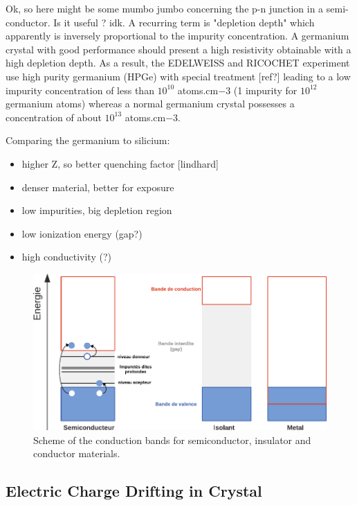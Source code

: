 Ok, so here might be some mumbo jumbo concerning the p-n junction in a semi-conductor. Is it useful ? idk.
A recurring term is "depletion depth" which apparently is inversely proportional to the impurity concentration.
A germanium crystal with good performance should present a high resistivity obtainable with a high depletion depth.
As a result, the EDELWEISS and RICOCHET experiment use high purity germanium (HPGe) with special treatment [ref?] leading to a low impurity concentration of less than $10^{10}$ atoms.cm${-3}$ (1 impurity for $10^{12}$ germanium atoms) whereas a normal germanium crystal possesses a concentration of about $10^{13}$ atoms.cm${-3}$.

Comparing the germanium to silicium:
\begin{itemize}
	\item higher Z, so better quenching factor [lindhard]
	\item denser material, better for exposure
	\item low impurities, big depletion region
	\item low ionization energy (gap?)
	\item high conductivity (?)
\end{itemize}

\begin{figure}
\centering
\includegraphics[width=\linewidth]{Figures/Electrodes/conduction_bands.pdf}
\caption{Scheme of the conduction bands for semiconductor, insulator and conductor materials.}
\label{fig:conduction-bands}
\end{figure}


\subsection{Electric Charge Drifting in Crystal}


